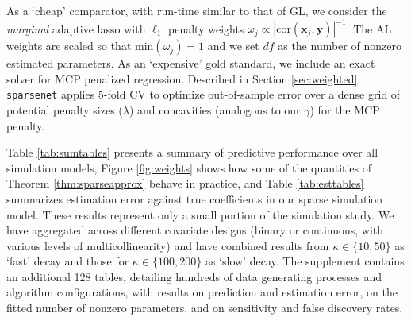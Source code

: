 \documentclass[12pt]{article}
\newcommand{\mr}[1]{\mathrm{#1}}
\newcommand{\bm}[1]{\mathbf{#1}}
\begin{document}
As a `cheap' comparator, with run-time similar to that of GL, we
consider the {\it marginal} adaptive lasso with $\ell_1$ penalty
weights $\omega_j
\propto |\mr{cor}(\bm{x}_j,\bm{y})|^{-1}$.   The AL weights are scaled so that
$\mathrm{min}(\omega_j)=1$ and we set $df$ as
the number of nonzero estimated parameters.   As an `expensive' gold standard,
we include an exact solver for MCP penalized regression. Described in Section \ref{sec:weighted}, {\tt sparsenet} applies 5-fold CV to
optimize out-of-sample error over a dense grid of potential penalty sizes
($\lambda$) and concavities (analogous to our $\gamma$) for the MCP penalty.


Table \ref{tab:sumtables} presents a summary of predictive performance over
all simulation models, Figure \ref{fig:weights}
shows how some of the quantities of Theorem \ref{thm:sparseapprox} behave in practice, and Table \ref{tab:esttables} summarizes estimation error against true coefficients in our sparse simulation model.
These results  represent only a small portion of the simulation
study.  We have aggregated across different covariate designs (binary or
continuous, with various levels of multicollinearity) and have combined
results from $\kappa \in \{10,50\}$ as  `fast' decay and those for $\kappa \in
\{100,200\}$ as `slow' decay.  
The supplement contains an additional
128 tables, detailing hundreds of data generating processes and
algorithm configurations, with results on prediction and estimation error, on the fitted number of nonzero
parameters, and on sensitivity and false discovery rates.
\end{document}
